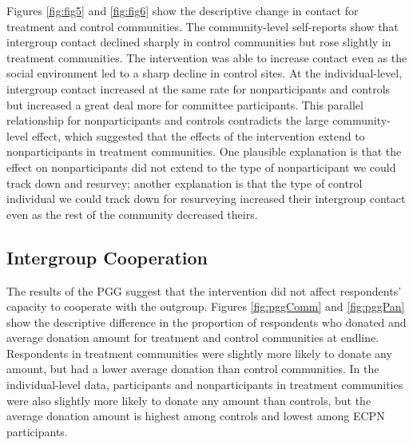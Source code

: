 \documentclass[11pt]{article}
\begin{document}
Figures \ref{fig:fig5} and \ref{fig:fig6} show the descriptive change in
contact for treatment and control communities. The community-level
self-reports show that intergroup contact declined sharply in control
communities but rose slightly in treatment communities. The intervention
was able to increase contact even as the social environment led to a
sharp decline in control sites. At the individual-level, intergroup
contact increased at the same rate for nonparticipants and controls but
increased a great deal more for committee participants. This parallel
relationship for nonparticipants and controls contradicts the large
community-level effect, which suggested that the effects of the
intervention extend to nonparticipants in treatment communities. One
plausible explanation is that the effect on nonparticipants did not
extend to the type of nonparticipant we could track down and resurvey;
another explanation is that the type of control individual we could
track down for resurveying increased their intergroup contact even as
the rest of the community decreased theirs.

\hypertarget{intergroup-cooperation}{%
\subsection{Intergroup Cooperation}\label{intergroup-cooperation}}

The results of the PGG suggest that the intervention did not affect
respondents' capacity to cooperate with the outgroup. Figures
\ref{fig:pggComm} and \ref{fig:pggPan} show the descriptive difference
in the proportion of respondents who donated and average donation amount
for treatment and control communities at endline. Respondents in
treatment communities were slightly more likely to donate any amount,
but had a lower average donation than control communities. In the
individual-level data, participants and nonparticipants in treatment
communities were also slightly more likely to donate any amount than
controls, but the average donation amount is highest among controls and
lowest among ECPN participants.
\end{document}
